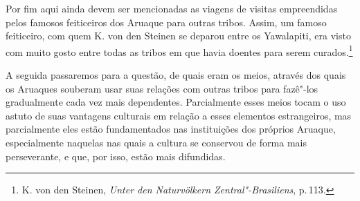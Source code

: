 Por fim aqui ainda devem ser mencionadas as viagens de visitas
empreendidas pelos famosos feiticeiros dos Aruaque para outras tribos.
Assim, um famoso feiticeiro, com quem K. von den Steinen se deparou
entre os Yawalapiti, era visto com muito gosto entre todas as tribos em
que havia doentes para serem curados.\footnote{K. von den Steinen,
  \textit{Unter den Naturvölkern Zentral"-Brasiliens}, p.\,113.}


A seguida passaremos para a questão, de quais eram os meios, através dos
quais os Aruaques souberam usar suas relações com outras tribos para
fazê"-los gradualmente cada vez mais dependentes. Parcialmente esses
meios tocam o uso astuto de suas vantagens culturais em relação a esses
elementos estrangeiros, mas parcialmente eles estão fundamentados nas
instituições dos próprios Aruaque, especialmente naquelas nas quais a
cultura se conservou de forma mais perseverante, e que, por isso, estão
mais difundidas.

